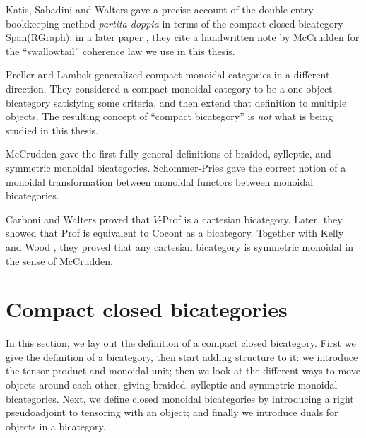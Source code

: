 \documentclass[12pt,twoside,openright]{report}
\begin{document}
Katis, Sabadini and Walters \cite{KSW98} gave a precise account of the double-entry bookkeeping method {\em partita doppia} in terms of the compact closed bicategory Span(RGraph); in a later paper \cite{KW99}, they cite a handwritten note by McCrudden for the ``swallowtail''
coherence law we use in this thesis.

Preller and Lambek \cite{PL07} generalized compact monoidal categories in a different direction.  They considered a compact monoidal category to be a one-object bicategory satisfying some criteria, and then extend that definition to multiple objects.  The resulting concept of ``compact bicategory'' is {\em not} what is being studied in this thesis.

McCrudden \cite{McCrudden} gave the first fully general definitions of braided, sylleptic, and symmetric monoidal bicategories.  Schommer-Pries
\cite{SPT} gave the correct notion of a monoidal transformation between monoidal functors between monoidal bicategories.

Carboni and Walters \cite{CW87} proved that $V$-Prof is a cartesian bicategory.  Later, they showed \cite{CW04} that Prof is equivalent to Cocont as a bicategory.  Together with Kelly and Wood \cite{CKWW08}, they proved that any cartesian bicategory is symmetric monoidal in the sense of McCrudden.

\section{Compact closed bicategories}
\label{definition}

In this section, we lay out the definition of a compact closed bicategory.  First we give the definition of a bicategory, then start adding structure to it: we introduce the tensor product and monoidal unit; then we look at the different ways to move objects around each other, giving braided, sylleptic and symmetric monoidal bicategories. Next, we define closed monoidal bicategories by introducing a right pseudoadjoint to tensoring with an object; and finally we introduce duals for objects in a bicategory.
\end{document}
